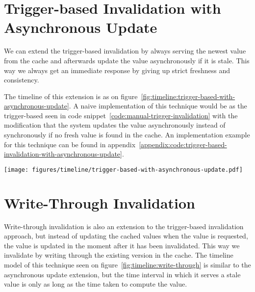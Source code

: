 
\section{Trigger-based Invalidation with Asynchronous Update}
\label{subsec:trigger-based-invalidation-with-asynchronous-update}

We can extend the trigger-based invalidation by always serving the newest value from the cache and afterwards update the value asynchronously if it is stale. This way we always get an immediate response by giving up strict freshness and consistency.

The timeline of this extension is as on figure~\ref{fig:timeline:trigger-based-with-asynchronous-update}. A naive implementation of this technique would be as the trigger-based seen in code snippet~\ref{code:manual-trigger-invalidation} with the modification that the system updates the value asynchronously instead of synchronously if no fresh value is found in the cache. An implementation example for this technique can be found in appendix~\ref{appendix:code:trigger-based-invalidation-with-asynchronous-update}.

\begin{figure*}[ht!]
  \centering
  \texttt{[image: figures/timeline/trigger-based-with-asynchronous-update.pdf]}
  \caption{The lifecycle of the \emph{trigger-based invalidation} technique where the value is updated in the asynchronous}
  \label{fig:timeline:trigger-based-with-asynchronous-update}
\end{figure*}


\section{Write-Through Invalidation}
\label{subsec:write_through_invalidation}

Write-through invalidation is also an extension to the trigger-based invalidation approach, but instead of updating the cached values when the value is requested, the value is updated in the moment after it has been invalidated. This way we invalidate by writing through the existing version in the cache. The timeline model of this technique seen on figure~\ref{fig:timeline:write-through} is similar to the asynchronous update extension, but the time interval in which it serves a stale value is only as long as the time taken to compute the value.

